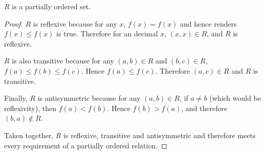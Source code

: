 
\begin{theorem}
  $R$ is a partially ordered set.
\end{theorem}

\begin{proof}
  $R$ is reflexive because for any $x$, $f(x) = f(x)$ and hence renders $f(x)
  \le f(x)$ is true. Therefore for an decimal $x$, $(x,x) \in R$, and $R$ is
  reflexive.

  $R$ is also transitive because for any $(a,b)\in R$ and $(b,c) \in R$, $f(a)
  \le f(b) \le f(c)$. Hence $f(a) \le f(c)$. Therefore $(a,c) \in R$ and $R$ is
  transitive.

  Finally, $R$ is antisymmetric because for any $(a,b)\in R$, if $a \ne b$
  (which would be reflexivity), then $f(a) < f(b)$. Hence $f(b) > f(a)$, and
  therefore $(b,a) \notin R$.

  Taken together, $R$ is reflexive, transitive and antisymmetric and therefore
  meets every requirement of a partially ordered relation.
\end{proof}
